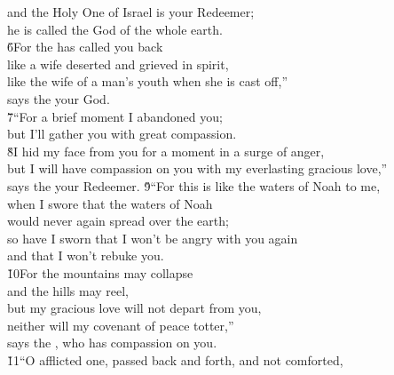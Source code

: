 \begin{poetry}
\poeml and the Holy One of Israel is your Redeemer; \\
\poemll    he is called the God of the whole earth. \\
\poeml \v{6}For the  has called you back \\
\poemll    like a wife deserted and grieved in spirit, \\
\poeml like the wife of a man's youth when she is cast off,'' \\
\poemll    says the  your God. \\
\poeml \v{7}``For a brief moment I abandoned you; \\
\poemll    but I'll gather you with great compassion. \\
\poeml \v{8}I hid my face from you for a moment in a surge of anger, \\
\poemll    but I will have compassion on you with my everlasting gracious love,'' \\
\poemlll       says the  your Redeemer.
\poeml \v{9}``For this is like the waters of Noah to me, \\
\poemll    when I swore that the waters of Noah \\
\poemlll       would never again spread over the earth; \\
\poeml so have I sworn that I won't be angry with you again \\
\poemll    and that I won't rebuke you. \\
\poeml \v{10}For the mountains may collapse \\
\poemll    and the hills may reel, \\
\poeml but my gracious love will not depart from you, \\
\poemll    neither will my covenant of peace totter,'' \\
\poemlll       says the , who has compassion on you. \\
\poeml \v{11}``O afflicted one, passed back and forth, and not comforted, \\

\end{poetry}
